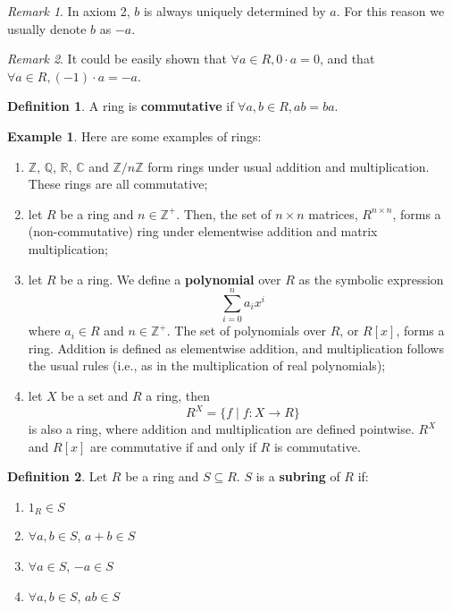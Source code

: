 \documentclass[12pt, a4paper, titlepage]{report}
\theoremstyle{plain} %
\theoremstyle{definition}
\newtheorem{defn}{Definition}[section]
\newtheorem{exmp}{Example}[section]
\theoremstyle{remark}
\newtheorem*{rem}{Remark}
\begin{document}
\begin{rem}
  In axiom 2, $b$ is always uniquely determined by $a$. For this reason we usually denote $b$ as $-a$.
\end{rem}

\begin{rem}
  It could be easily shown that $\forall a \in R, 0 \cdot a = 0$, and that $\forall a \in R, (-1) \cdot a = -a$.
\end{rem}

\begin{defn}
  A ring is \textbf{commutative} if $\forall a, b \in R, ab = ba$.
\end{defn}

\begin{exmp}
  Here are some examples of rings:
  \begin{enumerate}
  \item $\mathbb{Z}$, $\mathbb{Q}$, $\mathbb{R}$, $\mathbb{C}$ and $\mathbb{Z}/n\mathbb{Z}$ form rings under usual
    addition and multiplication. These rings are all commutative;
  \item let $R$ be a ring and $n \in \mathbb{Z}^{+}$. Then, the set of $n \times n$ matrices, $R^{n \times n}$, forms a
    (non-commutative) ring under elementwise addition and matrix multiplication;
  \item let $R$ be a ring. We define a \textbf{polynomial} over $R$ as the symbolic expression
    \[
      \sum_{i = 0}^{n} a_{i}x^{i}
    \]
    where $a_i \in R$ and $n \in \mathbb{Z}^{+}$.
    The set of polynomials over $R$, or $R[x]$, forms a ring. Addition is defined as elementwise addition, and multiplication
    follows the usual rules (i.e., as in the multiplication of real polynomials);
  \item let $X$ be a set and $R$ a ring, then
    \[
      R^{X} = \{ f \mid f : X \rightarrow R \}
    \]
    is also a ring, where addition and multiplication are defined pointwise. $R^{X}$ and $R[x]$ are commutative if and only if
    $R$ is commutative.
  \end{enumerate}
\end{exmp}

\begin{defn}
  Let $R$ be a ring and $S \subseteq R$. $S$ is a \textbf{subring} of $R$ if:
  \begin{enumerate}
  \item $1_{R} \in S$
  \item $\forall a, b \in S$, $a + b \in S$
  \item $\forall a \in S$, $-a \in S$
  \item $\forall a, b \in S$, $ab \in S$
  \end{enumerate}
\end{defn}
\end{document}
